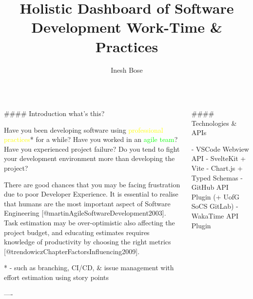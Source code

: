 \documentclass[]{beamer}
\author[under the supervision of Dr. Tim Storer]{Inesh Bose}
\title{Holistic Dashboard of Software\\Development Work-Time \& Practices}
\institute{University of Glasgow \hspace{1.8cm} \textit{\scriptsize Poster design inspired by \textbf{VSCode Dark theme}}}
\begin{document}
\begin{frame}[fragile]\centering


\begin{columns}
\begin{column}{0.57\textwidth}

\begin{markdown}

#### Introduction {\scriptsize what's this?}

Have you been developing software using \textcolor{yellow}{professional practices}* for a while? Have you worked in an \textcolor{lime}{agile team}? Have you experienced \textcolor{red!70}{project failure}? Do you tend to fight your \textcolor{cyan!80}{development environment} more than developing the project?

\vspace{0.4cm}

{\small There are good chances that you may be facing frustration due to poor Developer Experience. It is essential to realise that humans are the most important aspect of Software Engineering [@martinAgileSoftwareDevelopment2003]. Task estimation may be over-optimistic also affecting the project budget, and educating estimates requires knowledge of productivity by choosing the right metrics [@trendowiczChapterFactorsInfluencing2009].}

\vspace{0.4cm}

{\footnotesize {*} - such as branching, CI/CD, \& issue management with effort estimation using story points}

----
\end{markdown}
\end{column}

\begin{column}{.4\textwidth}
\begin{markdown}

#### Technologies \& APIs

- VSCode Webview API
- SvelteKit + Vite
- Chart.js + Typed Schemas
- GitHub API Plugin {\footnotesize (+ UofG SoCS GitLab)}
- WakaTime API Plugin

\vspace{0.5cm}


\end{markdown}
\end{column}
\end{columns}
\end{frame}
\end{document}
